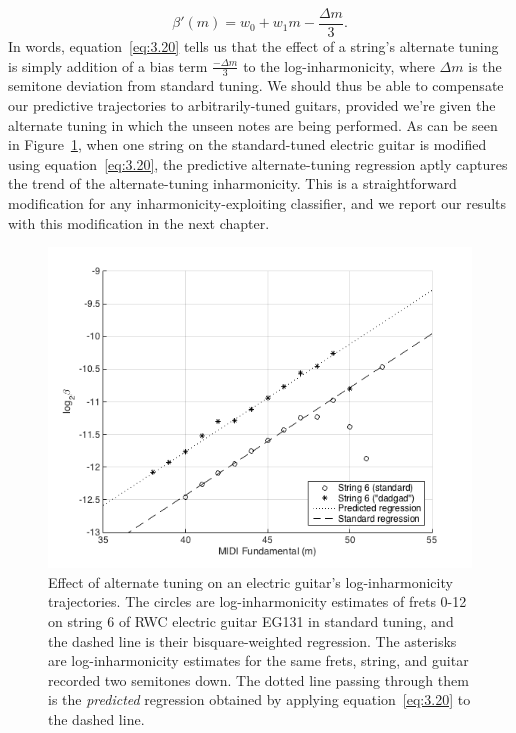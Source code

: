 \documentclass[12pt]{cmuthesis}
\begin{document}
\begin{equation}
\label{eq:3.20}
\beta'(m) = w_0 + w_1m - \frac{\Delta m}{3}.
\end{equation}
In words, equation~\eqref{eq:3.20} tells us that the effect of a string's alternate tuning is simply addition of a bias term $\frac{-\Delta m}{3}$ to the log-inharmonicity, where $\Delta m$ is the semitone deviation from standard tuning. We should thus be able to compensate our predictive trajectories to arbitrarily-tuned guitars, provided we're given the alternate tuning in which the unseen notes are being performed. As can be seen in Figure~\ref{fig:tuning-eg}, when one string on the standard-tuned electric guitar is modified using equation~\eqref{eq:3.20}, the predictive alternate-tuning regression aptly captures the trend of the alternate-tuning inharmonicity. This is a straightforward modification for any inharmonicity-exploiting classifier, and we report our results with this modification in the next chapter.
\begin{figure}[!htbp] 
\label{fig:tuning-eg}
\centering
\includegraphics[scale=0.75]{tuning-eg}
\caption{Effect of alternate tuning on an electric guitar's log-inharmonicity trajectories. The circles are log-inharmonicity estimates of frets 0-12 on string 6 of RWC electric guitar EG131 in standard tuning, and the dashed line is their bisquare-weighted regression. The asterisks are log-inharmonicity estimates for the same frets, string, and guitar recorded two semitones down. The dotted line passing through them is the \textit{predicted} regression obtained by applying equation~\eqref{eq:3.20} to the dashed line.}
\end{figure}
\end{document}
